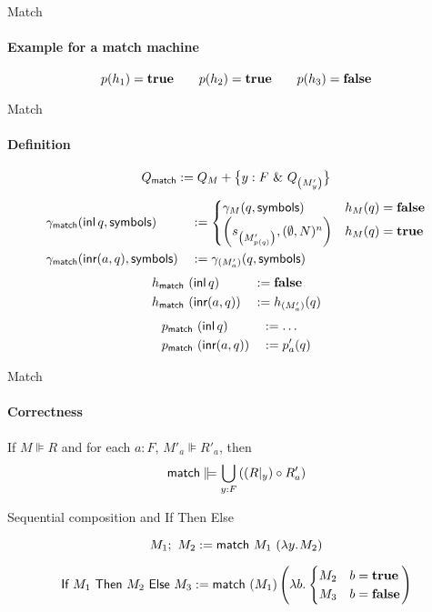 \begin{frame}{Match}
  \framesubtitle{Example for a match machine}
	\vspace{-1cm}
  
  \[
    p(h_1) = \mathbf{true} \qquad p(h_2) = \mathbf{true} \qquad p(h_3) = \mathbf{false}
  \]
\end{frame}

\begin{frame}{Match}
  \framesubtitle{Definition}
  \footnotesize
  $$Q_{\textsf{match}} := Q_M + \bigl\{ y:F~{\&}~Q_{ \left( M'_{y} \right) } \bigr \}$$
  \begin{alignat*}{2}
    \gamma_{\textsf{match}} & (\operatorname{\textsf{inl}} q, \textsf{symbols}) &&:=
    \begin{cases}
      \gamma_{M}(q, \textsf{symbols})                                & h_M(q) = \mathbf{false} \\
      \left( s_{\left(M'_{p(q)}\right)}, (\emptyset, N)^n \right)  & h_M(q) = \mathbf{true}
    \end{cases} \\
    \gamma_{\textsf{match}} & (\operatorname{\textsf{inr}} (a, q), \textsf{symbols}) &&:= \gamma_{\left({M'_a}\right)}(q, \textsf{symbols})
  \end{alignat*}
  \begin{alignat*}{3}
    h_{\textsf{match}} &~ (\operatorname{\textsf{inl}}      q) &&:= \mathbf{false} \\
    h_{\textsf{match}} &~ (\operatorname{\textsf{inr}} (a, q)) &&:= h_{\left( M'_a \right)}(q)
  \end{alignat*}
  \begin{alignat*}{3}
    p_{\textsf{match}} &~ (\operatorname{\textsf{inl}}      q) &&:= \dots \\
    p_{\textsf{match}} &~ (\operatorname{\textsf{inr}} (a, q)) &&:= p'_a(q)
  \end{alignat*}
\end{frame}

\begin{frame}{Match}
  \framesubtitle{Correctness}
  \begin{lemma}
    If $M \VDash R$ and for each $a:F$, $M'_a \VDash R'_a$, then
    $$\MS{match} \VDash \bigcup_{y:F} \left( (R \at y) \circ R'_a \right)$$
  \end{lemma}
\end{frame}


\begin{frame}{Sequential composition and If Then Else}

  \begin{definition}
    $$M_1 ;~ M_2 := \textsf{match}~M_1~(\lambda y{.}\hskip.7ptM_2)$$
  \end{definition}

  \begin{definition}[Boolean if]
    $$ \textsf{If}~M_1~\textsf{Then}~M_2~\textsf{Else}~M_3 := \textsf{match}~(M_1) \left(\lambda b{.}\hskip.7pt\begin{cases} M_2 & b = \mathbf{true} \\ M_3 & b = \mathbf{false} \end{cases} \right) $$
  \end{definition}

\end{frame}

